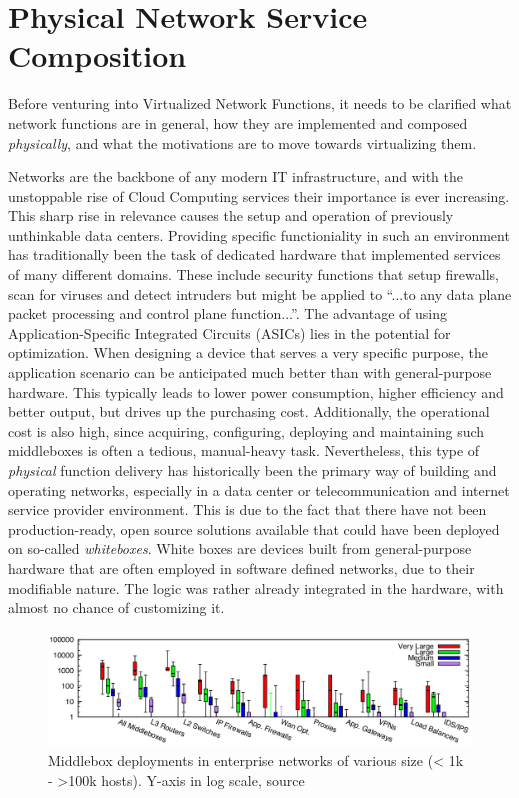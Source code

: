 \section{Physical Network Service Composition}
\label{sec:physical}
Before venturing into Virtualized Network Functions, it needs to be clarified what network functions are in general, how they are implemented and composed \textit{physically}, and what the motivations are to move towards virtualizing them. 

Networks are the backbone of any modern IT infrastructure, and with the unstoppable rise of  Cloud Computing services their importance is ever increasing. This sharp rise in relevance causes the setup and operation of previously unthinkable data centers. Providing specific functioniality in such an environment has traditionally been the task of dedicated hardware that implemented services of many different domains. These include security functions that setup firewalls, scan for viruses and detect intruders but might be applied to ``...to any data plane packet processing and control plane function...''\cite{nfv_wp}. The advantage of using Application-Specific Integrated Circuits (ASICs) lies in the potential for optimization. When designing a device that serves a very specific purpose, the application scenario can be anticipated much better than with general-purpose hardware. This typically leads to lower power consumption, higher efficiency and better output, but drives up the purchasing cost. Additionally, the operational cost is also high, since acquiring, configuring, deploying and maintaining such middleboxes is often a tedious, manual-heavy task. Nevertheless, this type of \textit{physical} function delivery has historically been the primary way of building and operating networks, especially in a data center or telecommunication and internet service provider environment. This is due to the fact that there have not been production-ready, open source solutions available that could have been deployed on so-called \textit{whiteboxes}. White boxes are devices built from general-purpose hardware that are often employed in software defined networks, due to their modifiable nature. The logic was rather already integrated in the hardware, with almost no chance of customizing it.


\begin{figure}[h]
	\centering
	\includegraphics[width=1\linewidth]{images/middleboxesNumbers.png}
	\caption{Middlebox deployments in enterprise networks of various size (< 1k - >100k hosts). Y-axis in log scale, source \cite{sherry2016middleboxes}}
	\label{img:middleboxesNumbers}
\end{figure}

